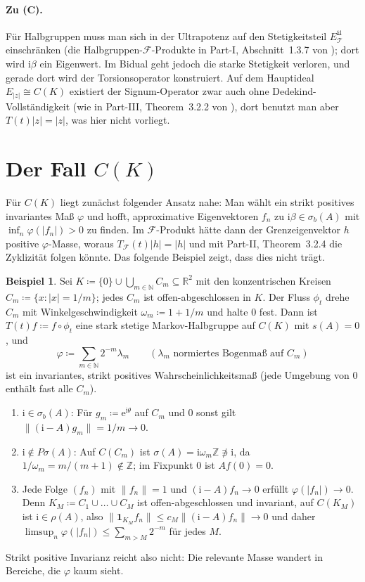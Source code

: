 \documentclass[11pt,a4paper]{article}
\theoremstyle{remark}
\theoremstyle{definition}
\newtheorem{beispiel}[satz]{Beispiel}
\newcommand{\R}{\mathbb{R}}
\newcommand{\Z}{\mathbb{Z}}
\newcommand{\N}{\mathbb{N}}
\newcommand{\TT}{\mathcal{T}}
\newcommand{\eu}{\mathrm{e}}
\newcommand{\im}{\mathrm{i}}
\begin{document}
\paragraph{Zu (C).}
Für Halbgruppen muss man sich in der Ultrapotenz auf den Stetigkeitsteil $E^{\mathfrak{U}}_{\TT}$ einschränken (die Halbgruppen-$\mathcal{F}$-Produkte in Part-I, Abschnitt~1.3.7 von \cite{ln}); dort wird $\im\beta$ ein Eigenwert.
Im Bidual geht jedoch die starke Stetigkeit verloren, und gerade dort wird der Torsionsoperator konstruiert.
Auf dem Hauptideal $E_{|z|} \cong C(K)$ existiert der Signum-Operator zwar auch ohne Dedekind-Vollständigkeit (wie in Part-III, Theorem~3.2.2 von \cite{ln}), dort benutzt man aber $T(t)|z| = |z|$, was hier nicht vorliegt.

\section{Der Fall \texorpdfstring{$C(K)$}{C(K)}}

Für $C(K)$ liegt zunächst folgender Ansatz nahe: Man wählt ein strikt positives invariantes Maß $\varphi$ und hofft, approximative Eigenvektoren $f_n$ zu $\im\beta \in \sigma_b(A)$ mit $\inf_n \varphi(|f_n|) > 0$ zu finden.
Im $\mathcal{F}$-Produkt hätte dann der Grenzeigenvektor $h$ positive $\varphi$-Masse, woraus $T_{\mathcal{F}}(t)|h| = |h|$ und mit Part-II, Theorem~3.2.4 die Zyklizität folgen könnte.
Das folgende Beispiel zeigt, dass dies nicht trägt.

\begin{beispiel}\label{bsp:kreise}
Sei $K \coloneqq \{0\} \cup \bigcup_{m \in \N} C_m \subseteq \R^2$ mit den konzentrischen Kreisen $C_m \coloneqq \{x \colon |x| = 1/m\}$; jedes $C_m$ ist offen-abgeschlossen in $K$.
Der Fluss $\phi_t$ drehe $C_m$ mit Winkelgeschwindigkeit $\omega_m \coloneqq 1 + 1/m$ und halte $0$ fest.
Dann ist $T(t)f \coloneqq f \circ \phi_t$ eine stark stetige Markov-Halbgruppe auf $C(K)$ mit $s(A) = 0$, und
\[
  \varphi \coloneqq \sum_{m \in \N} 2^{-m} \lambda_m \qquad (\lambda_m \text{ normiertes Bogenmaß auf } C_m)
\]
ist ein invariantes, strikt positives Wahrscheinlichkeitsmaß (jede Umgebung von $0$ enthält fast alle $C_m$).
\begin{enumerate}[label=(\roman*)]
\item $\im \in \sigma_b(A)$: Für $g_m \coloneqq \eu^{\im\theta}$ auf $C_m$ und $0$ sonst gilt $\|(\im - A)g_m\| = 1/m \to 0$.
\item $\im \notin P\sigma(A)$: Auf $C(C_m)$ ist $\sigma(A) = \im\omega_m\Z \not\ni \im$, da $1/\omega_m = m/(m+1) \notin \Z$; im Fixpunkt $0$ ist $Af(0) = 0$.
\item Jede Folge $(f_n)$ mit $\|f_n\| = 1$ und $(\im - A)f_n \to 0$ erfüllt $\varphi(|f_n|) \to 0$.
Denn $K_M \coloneqq C_1 \cup \dots \cup C_M$ ist offen-abgeschlossen und invariant, auf $C(K_M)$ ist $\im \in \rho(A)$, also $\|\mathbf{1}_{K_M} f_n\| \le c_M \|(\im - A)f_n\| \to 0$ und daher $\limsup_n \varphi(|f_n|) \le \sum_{m > M} 2^{-m}$ für jedes $M$.
\end{enumerate}
Strikt positive Invarianz reicht also nicht: Die relevante Masse wandert in Bereiche, die $\varphi$ kaum sieht.
\end{beispiel}
\end{document}
